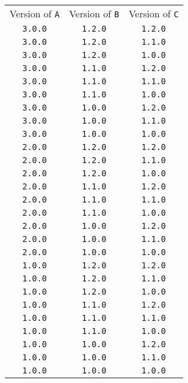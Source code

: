 \documentclass[11pt,a4paper,twocolumn]{article}
\renewcommand{\small}{\fontsize{9.5pt}{11.1pt}\selectfont}
\newcommand{\code}[1]{\texttt{#1}} %
\begin{document}
{\small
\begin{center}
\begin{tabular}{ c c c }
  Version of \code{A} & Version of \code{B} & Version of \code{C} \\
  \code{3.0.0} & \code{1.2.0} & \code{1.2.0} \\
  \code{3.0.0} & \code{1.2.0} & \code{1.1.0} \\
  \code{3.0.0} & \code{1.2.0} & \code{1.0.0} \\
  \code{3.0.0} & \code{1.1.0} & \code{1.2.0} \\
  \code{3.0.0} & \code{1.1.0} & \code{1.1.0} \\
  \code{3.0.0} & \code{1.1.0} & \code{1.0.0} \\
  \code{3.0.0} & \code{1.0.0} & \code{1.2.0} \\
  \code{3.0.0} & \code{1.0.0} & \code{1.1.0} \\
  \code{3.0.0} & \code{1.0.0} & \code{1.0.0} \\
  \code{2.0.0} & \code{1.2.0} & \code{1.2.0} \\
  \code{2.0.0} & \code{1.2.0} & \code{1.1.0} \\
  \code{2.0.0} & \code{1.2.0} & \code{1.0.0} \\
  \code{2.0.0} & \code{1.1.0} & \code{1.2.0} \\
  \code{2.0.0} & \code{1.1.0} & \code{1.1.0} \\
  \code{2.0.0} & \code{1.1.0} & \code{1.0.0} \\
  \code{2.0.0} & \code{1.0.0} & \code{1.2.0} \\
  \code{2.0.0} & \code{1.0.0} & \code{1.1.0} \\
  \code{2.0.0} & \code{1.0.0} & \code{1.0.0} \\
  \code{1.0.0} & \code{1.2.0} & \code{1.2.0} \\
  \code{1.0.0} & \code{1.2.0} & \code{1.1.0} \\
  \code{1.0.0} & \code{1.2.0} & \code{1.0.0} \\
  \code{1.0.0} & \code{1.1.0} & \code{1.2.0} \\
  \code{1.0.0} & \code{1.1.0} & \code{1.1.0} \\
  \code{1.0.0} & \code{1.1.0} & \code{1.0.0} \\
  \code{1.0.0} & \code{1.0.0} & \code{1.2.0} \\
  \code{1.0.0} & \code{1.0.0} & \code{1.1.0} \\
  \code{1.0.0} & \code{1.0.0} & \code{1.0.0} \\
\end{tabular}
\end{center}
}
\end{document}
